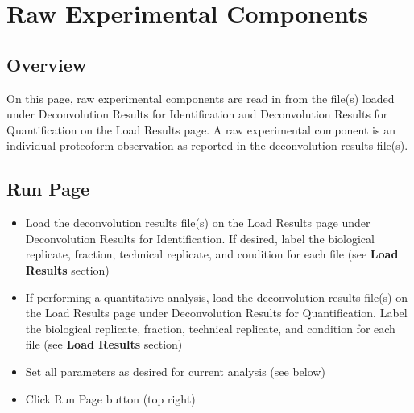 
\section{Raw Experimental Components}


\subsection{Overview}

On this page, raw experimental components are read in from the file(s) loaded under Deconvolution Results for Identification and Deconvolution Results for Quantification on the Load Results page. A raw experimental component is an individual proteoform observation as reported in the deconvolution results file(s). 

\subsection{Run Page}
\begin{itemize}
\item Load the deconvolution results file(s) on the Load Results page under Deconvolution Results for Identification. If desired, label the biological replicate, fraction, technical replicate, and condition for each file (see \textbf{Load Results} section)
\item If performing a quantitative analysis, load the deconvolution results file(s) on the Load Results page under Deconvolution Results for Quantification. Label the biological replicate, fraction, technical replicate, and condition for each file (see \textbf{Load Results} section)
\item Set all parameters as desired for current analysis (see below)
\item Click Run Page button (top right)
\end{itemize}

